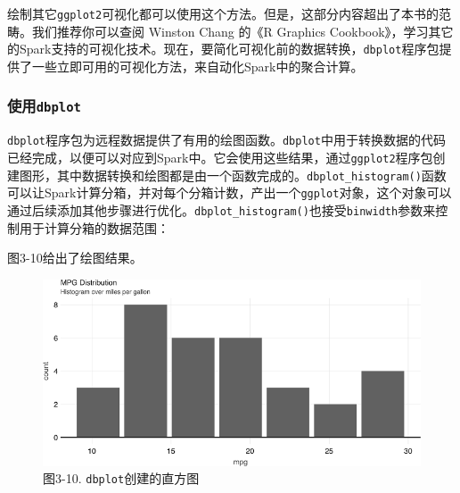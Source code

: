 \documentclass[
]{article}
\newenvironment{Shaded}{\begin{snugshade}}{\end{snugshade}}
\newcommand{\DataTypeTok}[1]{\textcolor[rgb]{0.13,0.29,0.53}{#1}}
\newcommand{\DecValTok}[1]{\textcolor[rgb]{0.00,0.00,0.81}{#1}}
\newcommand{\KeywordTok}[1]{\textcolor[rgb]{0.13,0.29,0.53}{\textbf{#1}}}
\newcommand{\NormalTok}[1]{#1}
\newcommand{\OperatorTok}[1]{\textcolor[rgb]{0.81,0.36,0.00}{\textbf{#1}}}
\newcommand{\StringTok}[1]{\textcolor[rgb]{0.31,0.60,0.02}{#1}}
\begin{document}
绘制其它\texttt{ggplot2}可视化都可以使用这个方法。但是，这部分内容超出了本书的范畴。我们推荐你可以查阅
Winston Chang 的《R Graphics
Cookbook》，学习其它的Spark支持的可视化技术。现在，要简化可视化前的数据转换，\texttt{dbplot}程序包提供了一些立即可用的可视化方法，来自动化Spark中的聚合计算。

\hypertarget{ux4f7fux7528dbplot}{%
\subsubsection{\texorpdfstring{使用\texttt{dbplot}}{使用dbplot}}\label{ux4f7fux7528dbplot}}

\texttt{dbplot}程序包为远程数据提供了有用的绘图函数。\texttt{dbplot}中用于转换数据的代码已经完成，以便可以对应到Spark中。它会使用这些结果，通过\texttt{ggplot2}程序包创建图形，其中数据转换和绘图都是由一个函数完成的。\texttt{dbplot\_histogram()}函数可以让Spark计算分箱，并对每个分箱计数，产出一个\texttt{ggplot}对象，这个对象可以通过后续添加其他步骤进行优化。\texttt{dbplot\_histogram()}也接受\texttt{binwidth}参数来控制用于计算分箱的数据范围：

\begin{Shaded}
\end{Shaded}

图3-10给出了绘图结果。

\begin{figure}
\centering
\includegraphics{figures/3_10.png}
\caption{图3-10. \texttt{dbplot}创建的直方图}
\end{figure}
\end{document}
